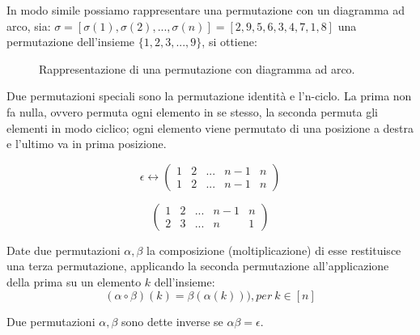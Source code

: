 In modo simile possiamo rappresentare una permutazione con un diagramma ad arco, sia:
$
\sigma = [\sigma(1),\sigma(2),...,\sigma(n)] = [2,9,5,6,3,4,7,1,8]
$
una permutazione dell'insieme $\{1,2,3,...,9\}$, si ottiene:

\begin{figure}[h]
\begin{center}
\end{center}
\caption{Rappresentazione di una permutazione con diagramma ad arco.}
\label{fig:permutazione}
\end{figure}

Due permutazioni speciali sono la permutazione identità e l'n-ciclo. La prima non fa nulla, ovvero permuta ogni elemento in se stesso, la seconda permuta gli elementi in modo ciclico; ogni elemento viene permutato di una posizione a destra e l'ultimo va in prima posizione. 

$$
\epsilon \leftrightarrow
  \begin{pmatrix}
    1 & 2 & ... & n-1 & n \\
    1 & 2 & ... & n-1 & n
  \end{pmatrix}
$$

$$
  \begin{pmatrix}
    1 & 2 & ... & n-1 & n \\
    2 & 3 & ... & n & 1
  \end{pmatrix}
$$

\begin{definition}
    Date due permutazioni $\alpha, \beta$ la composizione (moltiplicazione) di esse restituisce una terza permutazione, applicando la seconda permutazione all'applicazione della prima su un elemento $k$ dell'insieme: 
$$
(\alpha \circ \beta)(k) = \beta(\alpha(k))), per \ k\in [n]
$$
\end{definition}
\begin{definition}
    Due permutazioni $\alpha,\beta$ sono dette inverse se $\alpha\beta=\epsilon$.
\end{definition}

